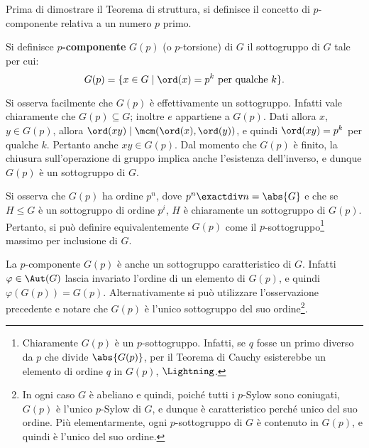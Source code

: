 \documentclass[12pt]{scrartcl}
\begin{document}
	
	Prima di dimostrare il Teorema di struttura, si definisce
	il concetto di $p$-componente relativa a un numero $p$
	primo.
	
	\begin{definition}[$p$-componente]
		Si definisce \textbf{$p$-componente} $G(p)$ (o $p$-torsione)
		di $G$ il sottogruppo di $G$ tale per cui:
		\[ G(p) = \{ x \in G \mid \ord(x) = p^k \text{ per qualche } k \}. \]
	\end{definition}
	
	\begin{remark}
		Si osserva facilmente che $G(p)$ è effettivamente
		un sottogruppo. Infatti vale chiaramente che
		$G(p) \subseteq G$; inoltre $e$ appartiene
		a $G(p)$. Dati allora $x$, $y \in G(p)$, allora
		$\ord(xy) \mid \mcm(\ord(x), \ord(y))$, e quindi
		$\ord(xy) = p^k$ per qualche $k$. Pertanto anche
		$xy \in G(p)$. Dal momento che $G(p)$ è finito,
		la chiusura sull'operazione di gruppo implica anche
		l'esistenza dell'inverso, e dunque
		$G(p)$ è un sottogruppo di $G$.
	\end{remark}
	
	\begin{remark}
		Si osserva che $G(p)$ ha ordine $p^n$, dove
		$p^n \exactdiv n = \abs{G}$ e che se $H \leq G$
		è un sottogruppo di ordine $p^i$, $H$ è chiaramente
		un sottogruppo di $G(p)$. Pertanto, si può definire
		equivalentemente $G(p)$ come il $p$-sottogruppo\footnote{
			Chiaramente $G(p)$ è un $p$-sottogruppo. Infatti,
			se $q$ fosse un primo diverso da $p$ che divide
			$\abs{G(p)}$, per il Teorema di Cauchy esisterebbe
			un elemento di ordine $q$ in $G(p)$, $\Lightning$.
		} massimo
		per inclusione di $G$.
	\end{remark}
	
	\begin{remark}
		La $p$-componente $G(p)$ è anche un sottogruppo caratteristico di $G$. Infatti
		$\varphi \in \Aut(G)$ lascia invariato l'ordine di
		un elemento di $G(p)$, e quindi $\varphi(G(p)) = G(p)$.
		Alternativamente si può utilizzare l'osservazione
		precedente e notare che $G(p)$ è l'unico sottogruppo
		del suo ordine\footnote{
			In ogni caso $G$ è abeliano e quindi, poiché
			tutti i $p$-Sylow sono coniugati, $G(p)$ è l'unico $p$-Sylow di $G$, e dunque
			è caratteristico perché unico del suo ordine.
			Più elementarmente, ogni $p$-sottogruppo di $G$
			è contenuto in $G(p)$, e quindi è l'unico del suo
			ordine.
		}.
	\end{remark}
	
\end{document}

